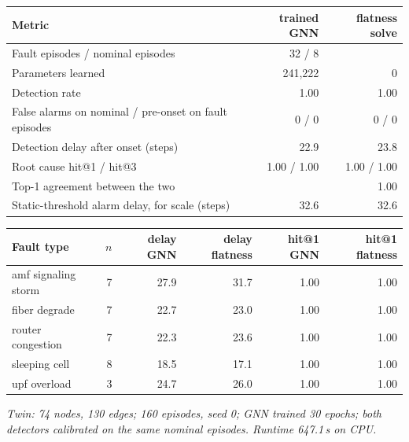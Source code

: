 \begin{center}\small\begin{tabular}{@{}p{7.2cm}rr@{}}\toprule Metric & trained GNN & flatness solve \\ \midrule
Fault episodes / nominal episodes & 32 / 8 &  \\
Parameters learned & 241,222 & 0 \\
Detection rate & 1.00 & 1.00 \\
False alarms on nominal / pre-onset on fault episodes & 0 / 0 & 0 / 0 \\
Detection delay after onset (steps) & 22.9 & 23.8 \\
Root cause hit@1 / hit@3 & 1.00 / 1.00 & 1.00 / 1.00 \\
Top-1 agreement between the two &  & 1.00 \\
Static-threshold alarm delay, for scale (steps) & 32.6 & 32.6 \\
\bottomrule\end{tabular}\end{center}

\begin{center}\small\begin{tabular}{@{}lrrrrr@{}}\toprule Fault type & $n$ & delay GNN & delay flatness & hit@1 GNN & hit@1 flatness \\ \midrule
amf signaling storm & 7 & 27.9 & 31.7 & 1.00 & 1.00 \\
fiber degrade & 7 & 22.7 & 23.0 & 1.00 & 1.00 \\
router congestion & 7 & 22.3 & 23.6 & 1.00 & 1.00 \\
sleeping cell & 8 & 18.5 & 17.1 & 1.00 & 1.00 \\
upf overload & 3 & 24.7 & 26.0 & 1.00 & 1.00 \\
\bottomrule\end{tabular}\end{center}
\noindent\textit{Twin: 74 nodes, 130 edges; 160 episodes, seed 0; GNN trained 30 epochs; both detectors calibrated on the same nominal episodes. Runtime 647.1\,s on CPU.}

